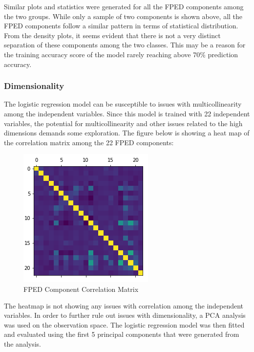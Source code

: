 \documentclass{article}
\begin{document}
Similar plots and statistics were generated for all the FPED components among the two groups. While only a sample of two components is shown above, all the FPED components follow a similar pattern in terms of statistical distribution. From the density plots, it seems evident that there is not a very distinct separation of these components among the two classes. This may be a reason for the training accuracy score of the model rarely reaching above 70\% prediction accuracy. 

\subsubsection{Dimensionality}
\label{sssec:subsubhead}

The logistic regression model can be susceptible to issues with multicollinearity among the independent variables. Since this model is trained with 22 independent variables, the potential for multicollinearity and other issues related to the high dimensions demands some exploration. The figure below is showing a heat map of the correlation matrix among the 22 FPED components:\\

\begin{figure}[htb]
\begin{minipage}[b]{1.0\linewidth}
  \centering
  \centerline{\includegraphics[scale=0.35]{Corr_Matrix.png}}
\end{minipage}
\caption{FPED Component Correlation Matrix}
\label{fig:res}
\end{figure}

The heatmap is not showing any issues with correlation among the independent variables. In order to further rule out issues with dimensionality, a PCA analysis was used on the observation space. The logistic regression model was then fitted and evaluated using the first 5 principal components that were generated from the analysis.\\
\end{document}
